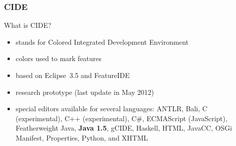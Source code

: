 \subsubsection*{CIDE}
\begin{frame}{\myframetitle\mysource{\cide}}
	\begin{mycolumns}[widths={60},animation=none]
	\mynextcolumn
		\begin{example}{What is CIDE?}
			\begin{itemize}
				\item stands for Colored Integrated Development Environment
				\item colors used to mark features
				\item based on Eclipse~3.5 and FeatureIDE
				\item research prototype (last update in May 2012)
				\item special editors available for several languages:
				ANTLR, Bali, C (experimental), C++ (experimental), C\#, ECMAScript (JavaScript), Featherweight Java, \textbf{Java 1.5}, gCIDE, Haskell, HTML, JavaCC, OSGi Manifest, Properties, Python, and XHTML
			\end{itemize}
		\end{example}
	\end{mycolumns}
\end{frame}

